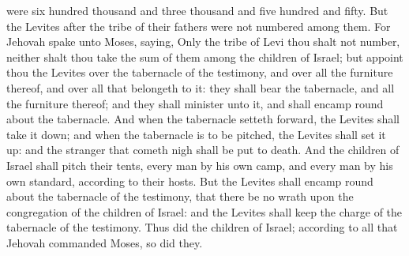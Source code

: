were six hundred thousand and three thousand and five hundred and fifty.  But the Levites after the tribe of their fathers were not numbered among them. For Jehovah spake unto Moses, saying, Only the tribe of Levi thou shalt not number, neither shalt thou take the sum of them among the children of Israel; but appoint thou the Levites over the tabernacle of the testimony, and over all the furniture thereof, and over all that belongeth to it: they shall bear the tabernacle, and all the furniture thereof; and they shall minister unto it, and shall encamp round about the tabernacle. And when the tabernacle setteth forward, the Levites shall take it down; and when the tabernacle is to be pitched, the Levites shall set it up: and the stranger that cometh nigh shall be put to death. And the children of Israel shall pitch their tents, every man by his own camp, and every man by his own standard, according to their hosts. But the Levites shall encamp round about the tabernacle of the testimony, that there be no wrath upon the congregation of the children of Israel: and the Levites shall keep the charge of the tabernacle of the testimony. Thus did the children of Israel; according to all that Jehovah commanded Moses, so did they. 

